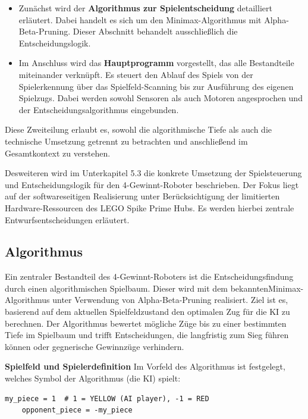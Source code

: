 \begin{itemize}
	\item Zunächst wird der \textbf{Algorithmus zur Spielentscheidung} detailliert erläutert. Dabei handelt es sich um den Minimax-Algorithmus mit Alpha-Beta-Pruning. Dieser Abschnitt behandelt ausschließlich die Entscheidungslogik.
	
	\item Im Anschluss wird das \textbf{Hauptprogramm} vorgestellt, das alle Bestandteile miteinander verknüpft. Es steuert den Ablauf des Spiels von der Spielerkennung über das Spielfeld-Scanning bis zur Ausführung des eigenen Spielzugs. Dabei werden sowohl Sensoren als auch Motoren angesprochen und der Entscheidungsalgorithmus eingebunden.
\end{itemize}

Diese Zweiteilung erlaubt es, sowohl die algorithmische Tiefe als auch die technische Umsetzung getrennt zu betrachten und anschließend im Gesamtkontext zu verstehen.

Desweiteren wird im Unterkapitel 5.3 die konkrete Umsetzung der Spielsteuerung und Entscheidungslogik für den 4-Gewinnt-Roboter beschrieben. Der Fokus liegt auf der softwareseitigen Realisierung unter Berücksichtigung der limitierten Hardware-Ressourcen des LEGO Spike Prime Hubs. Es werden hierbei zentrale Entwurfsentscheidungen erläutert.


\subsection{Algorithmus}

Ein zentraler Bestandteil des 4-Gewinnt-Roboters ist die Entscheidungsfindung durch einen algorithmischen Spielbaum. Dieser wird mit dem bekannten\newline Minimax-Algorithmus unter Verwendung von Alpha-Beta-Pruning realisiert. Ziel ist es, basierend auf dem aktuellen Spielfeldzustand den optimalen Zug für die KI zu berechnen.
Der Algorithmus bewertet mögliche Züge bis zu einer bestimmten Tiefe im Spielbaum und trifft Entscheidungen, die langfristig zum Sieg führen können oder gegnerische Gewinnzüge verhindern.

\textbf{Spielfeld und Spielerdefinition}
Im Vorfeld des Algorithmus ist festgelegt, welches Symbol der Algorithmus (die KI) spielt:

\begin{lstlisting}[style=pythonstyle]
	my_piece = 1  # 1 = YELLOW (AI player), -1 = RED
	opponent_piece = -my_piece
\end{lstlisting}

